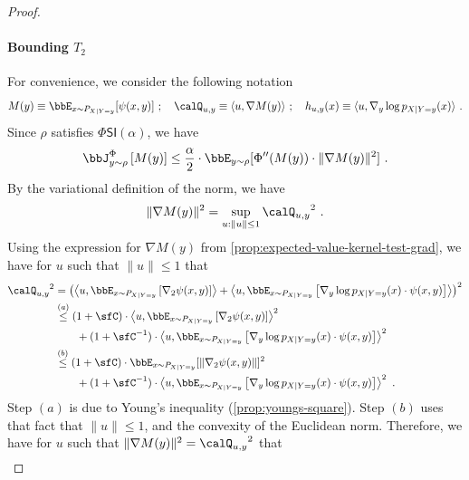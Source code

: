 \documentclass[11pt]{article}
\newcounter{ct}
\newcommand{\PhiSI}[1]{\Phi\mathsf{SI}\left(#1\right)}
\newcommand{\Phient}[3]{
    \ensuremath{\if$#3$\bbJ_{#1}^{#2}\else\bbJ_{#1}^{#2}\left[#3\right]\fi}}
\begin{document}
\begin{proof}
\paragraph{Bounding \(T_{2}\)}
For convenience, we consider the following notation
\begin{equation}
\label{eq:shorthand-not}
    M(y) \equiv \bbE_{x \sim P_{X | Y = y}}[\psi(x, y)]~; \quad \calQ_{u, y} \equiv \langle u, \nabla M(y)\rangle~; \quad h_{u, y}(x) \equiv \langle u, \nabla_{y}\log p_{X | Y = y}(x)\rangle~.
\end{equation}
Since \(\rho\) satisfies \(\PhiSI{\alpha}\), we have
\begin{equation*}
    \Phient{y \sim \rho}{\Phi}{M(y)} \leq \frac{\alpha}{2} \cdot \bbE_{y \sim \rho}[\Phi''(M(y)) \cdot \|\nabla M(y)\|^{2}]~.
\end{equation*}
By the variational definition of the norm, we have
\begin{equation*}
    \|\nabla M(y)\|^{2} = \sup_{u : \|u\| \leq 1} {\calQ_{u, y}}^{2}~.
\end{equation*}
Using the expression for \(\nabla M(y)\) from \cref{prop:expected-value-kernel-test-grad}, we have for \(u\) such that \(\|u\| \leq 1\) that
\begin{align*}
    {\calQ_{u, y}}^{2} &= \left(\left\langle u, \bbE_{x \sim P_{X | Y = y}}\left[\nabla_{2}\psi(x, y)\right]\right\rangle + \left\langle u, \bbE_{x \sim P_{X | Y = y}}\left[\nabla_{y}\log p_{X | Y = y}(x) \cdot \psi(x, y)\right]\right\rangle\right)^{2} \\
    &\overset{(a)}\leq (1 + \sfC) \cdot \left\langle u, \bbE_{x \sim P_{X | Y = y}}\left[\nabla_{2}\psi(x, y)\right]\right\rangle^{2} \\
    &\qquad + (1 + \sfC^{-1}) \cdot \left\langle u, \bbE_{x \sim P_{X | Y = y}}\left[\nabla_{y}\log p_{X | Y = y}(x) \cdot \psi(x, y)\right]\right\rangle^{2} \\
    &\overset{(b)}\leq (1 + \sfC) \cdot \bbE_{x \sim P_{X | Y = y}}[\|\nabla_{2}\psi(x, y)\|]^{2} \\
    &\qquad + (1 + \sfC^{-1}) \cdot \left\langle u, \bbE_{x \sim P_{X | Y = y}}\left[\nabla_{y}\log p_{X | Y = y}(x) \cdot \psi(x, y) \right]\right\rangle^{2}~.
\end{align*}
Step \((a)\) is due to Young's inequality (\cref{prop:youngs-square}).
Step \((b)\) uses that fact that \(\|u\| \leq 1\), and the convexity of the Euclidean norm.
Therefore, we have for \(u\) such that \(\|\nabla M(y)\|^{2} = {\calQ_{u, y}}^{2}\) that
\begin{align*}

\end{align*}
\end{proof}
\end{document}
